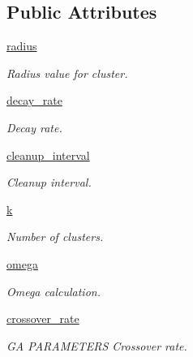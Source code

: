 \subsection*{Public Attributes}
\begin{DoxyCompactItemize}
\item 
\hyperlink{classStreamClusteringAlgorithms_1_1evoStream_1_1v1_1_1Algorithm_1_1EvoStreamV1_1_1EvoStreamV1_ac805f8978600ec627155602f0a300acb}{radius}
\begin{DoxyCompactList}\small\item\em Radius value for cluster. \end{DoxyCompactList}\item 
\hyperlink{classStreamClusteringAlgorithms_1_1evoStream_1_1v1_1_1Algorithm_1_1EvoStreamV1_1_1EvoStreamV1_ad946d36cc9c641fccdeaf3535ffbd92c}{decay\+\_\+rate}
\begin{DoxyCompactList}\small\item\em Decay rate. \end{DoxyCompactList}\item 
\hyperlink{classStreamClusteringAlgorithms_1_1evoStream_1_1v1_1_1Algorithm_1_1EvoStreamV1_1_1EvoStreamV1_a46771a05845bae3fc47e2b5a2dc35a9b}{cleanup\+\_\+interval}
\begin{DoxyCompactList}\small\item\em Cleanup interval. \end{DoxyCompactList}\item 
\hyperlink{classStreamClusteringAlgorithms_1_1evoStream_1_1v1_1_1Algorithm_1_1EvoStreamV1_1_1EvoStreamV1_adcee0667881d3fa73fecfe7c42874261}{k}
\begin{DoxyCompactList}\small\item\em Number of clusters. \end{DoxyCompactList}\item 
\hyperlink{classStreamClusteringAlgorithms_1_1evoStream_1_1v1_1_1Algorithm_1_1EvoStreamV1_1_1EvoStreamV1_a2418409c6f9e3c80fe0998aeff08f3d2}{omega}
\begin{DoxyCompactList}\small\item\em Omega calculation. \end{DoxyCompactList}\item 
\hyperlink{classStreamClusteringAlgorithms_1_1evoStream_1_1v1_1_1Algorithm_1_1EvoStreamV1_1_1EvoStreamV1_a55bc61778be7d7993c378abd0da8afe0}{crossover\+\_\+rate}
\begin{DoxyCompactList}\small\item\em GA P\+A\+R\+A\+M\+E\+T\+E\+RS Crossover rate. \end{DoxyCompactList}\item 

\end{DoxyCompactItemize}
